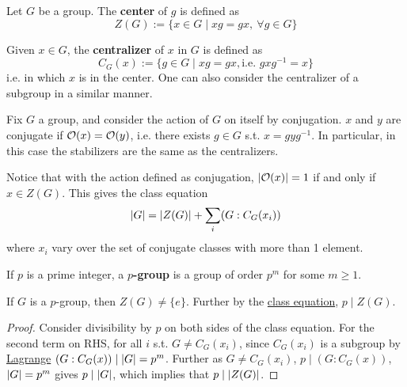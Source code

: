 \begin{definition}[Center]
    Let $G$ be a group. The \textbf{center} of $g$ is defined as
    \[
        Z(G) := \{ x \in G \mid xg = gx,\ \forall g \in G \}
    \]
\end{definition}

\begin{definition}[Centralizer]
    Given $x \in G$, the \textbf{centralizer} of $x$ in $G$ is defined as
    \[
        C_G(x) := \{ g \in G \mid xg = gx, \text{i.e. }gxg^{-1} = x \}
    \]
    i.e. in which $x$ is in the center. One can also consider the centralizer of a subgroup in a similar manner. 
\end{definition}

\begin{example}
    Fix $G$ a group, and consider the action of $G$ on itself by conjugation. $x$ and $y$ are conjugate if $\mathcal{O}(x) = \mathcal{O}(y)$, i.e. there exists $g \in G$ s.t. $x = gyg^{-1}$. In particular, in this case the stabilizers are the same as the centralizers.

    Notice that with the action defined as conjugation, $\left|\mathcal{O}(x)\right| = 1$ if and only if $x \in Z(G)$. This gives the class equation 
    \begin{equation}\label{eq: class equation}
        \left|G\right| = \left|Z(G)\right| + \sum_i (G : C_G(x_i))
    \end{equation}
    where $x_i$ vary over the set of conjugate classes with more than 1 element. 
\end{example}

\begin{definition}[$p$-group]
    If $p$ is a prime integer, a \textbf{$p$-group} is a group of order $p^m$ for some $m \geq 1$.
\end{definition}

\begin{proposition}\label{prop: center of p group has order divisible by p}
    If $G$ is a $p$-group, then $Z(G) \neq \{e\}$. Further by the \hyperref[eq: class equation]{class equation}, $p \mid Z(G)$.
\end{proposition}

\begin{proof}
    Consider divisibility by $p$ on both sides of the class equation. For the second term on RHS, for all $i$ s.t. $G \neq C_G(x_i)$, since $C_G(x_i)$ is a subgroup by \hyperref[thm: Lagrange]{Lagrange} $(G : C_G(x)) \mid \left|G\right| = p^m$. Further as $G \neq C_G(x_i)$, $p \mid (G : C_G(x))$, $\left|G\right| = p^m$ gives $p \mid \left|G\right|$, which implies that $p \mid \left|Z(G)\right|$.
\end{proof}

